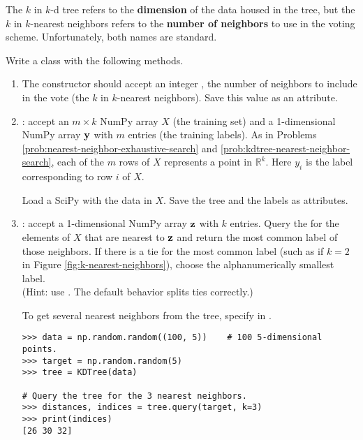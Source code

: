 \begin{warn}
The $k$ in $k$-d tree refers to the \textbf{dimension} of the data housed in the tree, but the $k$ in $k$-nearest neighbors refers to the \textbf{number of neighbors} to use in the voting scheme.
Unfortunately, both names are standard.
\end{warn}

\begin{problem} %
\label{prob:kneighbors-classifier}
Write a  class with the following methods.
\begin{enumerate}
\item The constructor should accept an integer , the number of neighbors to include in the vote (the $k$ in $k$-nearest neighbors).
Save this value as an attribute.

\item {}: accept an $m\times k$ NumPy array $X$ (the training set) and a 1-dimensional NumPy array $\mathbf{y}$ with $m$ entries (the training labels).
As in Problems \ref{prob:nearest-neighbor-exhaustive-search} and \ref{prob:kdtree-nearest-neighbor-search}, each of the $m$ rows of $X$ represents a point in $\mathbb{R}^k$.
Here $y_i$ is the label corresponding to row $i$ of $X$.

Load a SciPy  with the data in $X$.
Save the tree and the labels as attributes.

\item {}: accept a 1-dimensional NumPy array $\mathbf{z}$ with $k$ entries.
Query the  for the  elements of $X$ that are nearest to $\mathbf{z}$ and return the most common label of those neighbors.
If there is a tie for the most common label (such as if $k=2$ in Figure \ref{fig:k-nearest-neighbors}), choose the alphanumerically smallest label.
\\(Hint: use . The default behavior splits ties correctly.)

To get several nearest neighbors from the tree, specify  in .
\begin{lstlisting}
>>> data = np.random.random((100, 5))    # 100 5-dimensional points.
>>> target = np.random.random(5)
>>> tree = KDTree(data)

# Query the tree for the 3 nearest neighbors.
>>> distances, indices = tree.query(target, k=3)
>>> print(indices)
[26 30 32]
\end{lstlisting}
\end{enumerate}
\end{problem}

